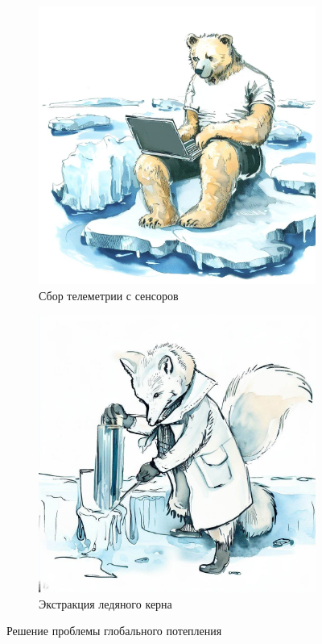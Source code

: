 \documentclass[a5paper,11pt]{memoir}
\begin{document}
\newpage
\hfill
{}
\BgThispage

\newpage

\renewcommand{\thefigure}{\arabic{figure}}

\begin{figure}[t]
  \begin{subfigure}{.5\paperwidth}
    \centering
    \includegraphics[width=.8\linewidth]{images/bear-laptop.jpg}
    \caption{Сбор телеметрии с сенсоров}
  \end{subfigure}%
  \begin{subfigure}{.5\paperwidth}
    \centering
    \includegraphics[width=.8\linewidth]{images/fox-ice-core.jpg}
    \caption{Экстракция ледяного керна}
  \end{subfigure}
  \caption{Решение проблемы глобального потепления}
\end{figure}
\end{document}
